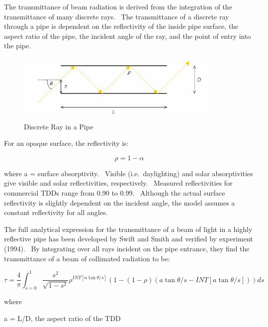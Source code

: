 The transmittance of beam radiation is derived from the integration of the transmittance of many discrete rays.~ The transmittance of a discrete ray through a pipe is dependent on the reflectivity of the inside pipe surface, the aspect ratio of the pipe, the incident angle of the ray, and the point of entry into the pipe.

\begin{figure}[hbtp] %
\centering
\includegraphics[width=0.9\textwidth, height=0.9\textheight, keepaspectratio=true]{media/image871.png}
\caption{Discrete Ray in a Pipe \protect \label{fig:discrete-ray-in-a-pipe}}
\end{figure}

For an opaque surface, the reflectivity is:

\begin{equation}
\rho  = 1 - \alpha
\end{equation}

where a = surface absorptivity.~ Visible (i.e.~daylighting) and solar absorptivities give visible and solar reflectivities, respectively.~ Measured reflectivities for commercial TDDs range from 0.90 to 0.99.~ Although the actual surface reflectivity is slightly dependent on the incident angle, the model assumes a constant reflectivity for all angles.

The full analytical expression for the transmittance of a beam of light in a highly reflective pipe has been developed by Swift and Smith and verified by experiment (1994).~ By integrating over all rays incident on the pipe entrance, they find the transmittance of a beam of collimated radiation to be:

\begin{equation}
\tau  = \frac{4}{\pi }\int_{s = 0}^1 {\frac{{{s^2}}}{{\sqrt {1 - {s^2}} }}} {\rho ^{INT\left[ {a\tan \theta /s} \right]}}\left( {1 - \left( {1 - \rho } \right)\left( {a\tan \theta /s - INT\left[ {a\tan \theta /s} \right]} \right)} \right)ds
\end{equation}

where

a = L/D, the aspect ratio of the TDD

